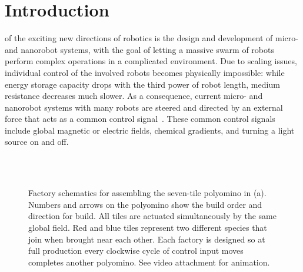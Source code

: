 \section{Introduction}\label{sec:Intro}

 of the exciting new directions of robotics is the design and development
of micro- and nanorobot systems, with the goal of letting a massive swarm of robots
perform complex operations in a complicated environment. Due to scaling 
issues, individual control of the involved robots becomes physically impossible:
while energy storage capacity drops with the third power of robot length,
medium resistance decreases much slower. As a consequence,
current micro- and nanorobot systems with many robots are steered and
directed by an external force that acts as a common control signal~\cite{Donald2013,Chiang2011,Hsi-Wen2012,Diller2013,Jing2013,Ou2013,Lanauze2013}.
These common control signals include global magnetic or electric fields,
chemical gradients, and turning a light source on and off. 

\begin{figure}
\centering
{}  \\ \vspace{-.8em}
 \\ \vspace{-.8em}      
\caption{\label{fig:factorySchematics}Factory schematics for assembling the seven-tile polyomino in (a).  Numbers and arrows on the polyomino show the build order and direction for build. All tiles are actuated simultaneously by the same global field. Red and blue tiles represent two different species that join when brought near each other. Each factory is designed so at full production every clockwise cycle of control input moves completes another polyomino. See video attachment for animation.}
\end{figure}
 
